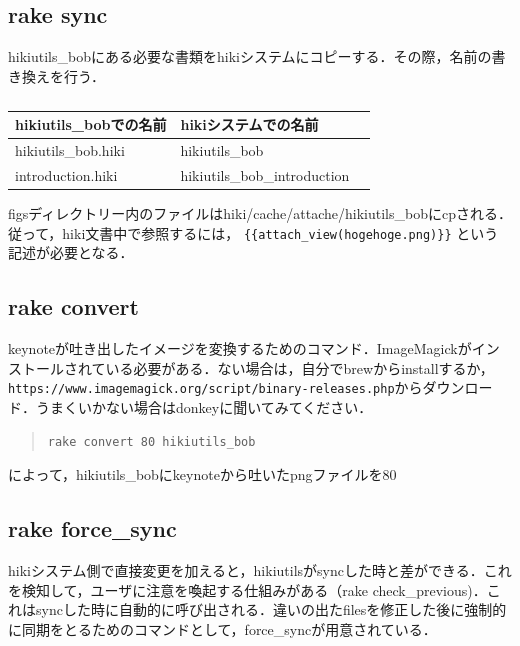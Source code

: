 \documentclass[12pt,a4paper]{jsarticle}
\begin{document}
\subsection{rake sync}
hikiutils\_bobにある必要な書類をhikiシステムにコピーする．その際，名前の書き換えを行う．

\begin{table}[htbp]\begin{center}
\caption{}
\begin{tabular}{lll}
\hline
hikiutils\_bobでの名前   &hikiシステムでの名前  \\ \hline
hikiutils\_bob.hiki   &hikiutils\_bob  \\
introduction.hiki   &hikiutils\_bob\_introduction  \\
\hline
\end{tabular}
\label{default}
\end{center}\end{table}

figsディレクトリー内のファイルはhiki/cache/attache/hikiutils\_bobにcpされる．従って，hiki文書中で参照するには，
\verb|{{attach_view(hogehoge.png)}}|
という記述が必要となる．

\subsection{rake convert}
keynoteが吐き出したイメージを変換するためのコマンド．ImageMagickがインストールされている必要がある．ない場合は，自分でbrewからinstallするか，\verb|https://www.imagemagick.org/script/binary-releases.php|からダウンロード．うまくいかない場合はdonkeyに聞いてみてください．
\begin{quote}\begin{verbatim}
rake convert 80 hikiutils_bob
\end{verbatim}\end{quote}
によって，hikiutils\_bobにkeynoteから吐いたpngファイルを80%

\subsection{rake force\_sync}
hikiシステム側で直接変更を加えると，hikiutilsがsyncした時と差ができる．これを検知して，ユーザに注意を喚起する仕組みがある（rake check\_previous)．これはsyncした時に自動的に呼び出される．違いの出たfilesを修正した後に強制的に同期をとるためのコマンドとして，force\_syncが用意されている．
\end{document}
